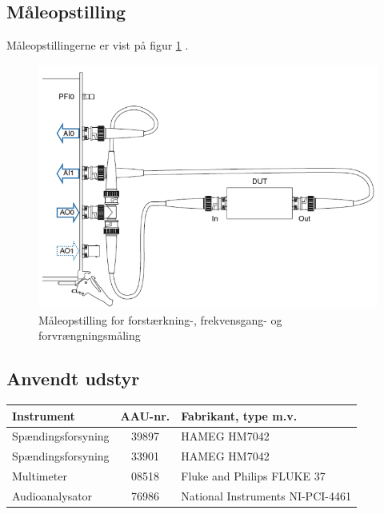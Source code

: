 \subsection*{Måleopstilling}
Måleopstillingerne er vist på figur \ref{fig:indgang:maaleop-thd} .

\begin{figure}[h]
\centering
\includegraphics[scale=0.4]{maalerapporter/indgangsvaelger/maaleopstilling-thd-forforstaerker.png}
\caption{Måleopstilling for forstærkning-, frekvensgang- og forvrængningsmåling}
\label{fig:indgang:maaleop-thd}
\end{figure}


\subsection*{Anvendt udstyr}

\begin{table}[h]
\centering
\begin{tabular}{l|c|l}
\hline\hline
Instrument & AAU-nr. & Fabrikant, type m.v. \\
\hline\hline
Spændingsforsyning & 39897 & HAMEG HM7042 \\[4pt]
Spændingsforsyning & 33901 & HAMEG HM7042 \\[4pt]
Multimeter & 08518 & Fluke and Philips FLUKE 37 \\[4pt]
Audioanalysator & 76986 & National Instruments NI-PCI-4461 \\
\hline\hline
\end{tabular}
\label{tab:indgang:maaleudstyr_forforstaerker}
\end{table}

